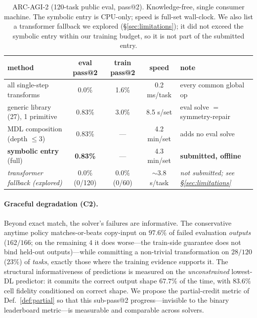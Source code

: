 \begin{table}[t]\centering
\caption{ARC-AGI-2 (120-task public eval, pass@2). Knowledge-free, single consumer machine. The symbolic
entry is CPU-only; speed is full-set wall-clock. We also list a transformer fallback we explored
(\S\ref{sec:limitations}); it did not exceed the symbolic entry within our training budget, so it is not part
of the submitted entry.}
\label{tab:arc}
\footnotesize
\setlength{\tabcolsep}{4pt}
\begin{tabular}{lcccl}
\toprule
method & eval pass@2 & train pass@2 & speed & note \\
\midrule
all single-step transforms & 0.0\% & 1.6\% & 0.2 ms/task & every common global op \\
generic library (27), 1 primitive & 0.83\% & 3.0\% & 8.5 s/set & eval solve $=$ symmetry-repair \\
MDL composition (depth $\le 3$) & 0.83\% & --- & 4.2 min/set & adds no eval solve \\
\textbf{symbolic entry} (full) & \textbf{0.83\%} & --- & 4.3 min/set & \textbf{submitted, offline} \\
\midrule
\emph{transformer fallback (explored)} & $0.0\%$ (0/120) & $0.0\%$ (0/60) & $\sim$3.8 s/task & \emph{not submitted; see \S\ref{sec:limitations}} \\
\bottomrule
\end{tabular}
\end{table}

\paragraph{Graceful degradation (C2).} Beyond exact match, the solver's failures are informative. The
conservative anytime policy matches-or-beats copy-input on $97.6\%$ of failed evaluation \emph{outputs}
($162/166$; on the remaining $4$ it does worse---the train-side guarantee does not bind held-out
outputs)---while committing a non-trivial transformation on $28/120$ ($23\%$) of \emph{tasks}, exactly those
where the training evidence supports it. The structural informativeness of predictions is measured on the
\emph{unconstrained} lowest-DL predictor: it commits the correct output shape $67.7\%$ of the time, with
$83.6\%$ cell fidelity conditioned on correct shape. We propose the
partial-credit metric of Def.~\ref{def:partial} so that this sub-pass@2 progress---invisible to the binary
leaderboard metric---is measurable and comparable across solvers.

